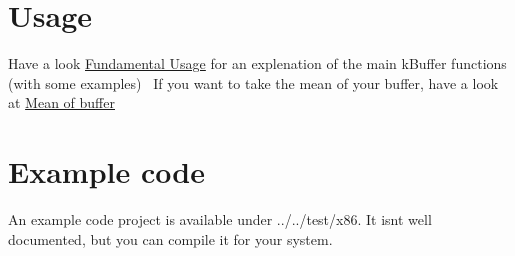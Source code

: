  \hypertarget{index_usage}{}\section{Usage}\label{index_usage}
Have a look \hyperlink{fundamental_usage}{Fundamental Usage} for an explenation of the main k\+Buffer functions (with some examples)~\newline
 If you want to take the mean of your buffer, have a look at \hyperlink{mean}{Mean of buffer} \hypertarget{index_example}{}\section{Example code}\label{index_example}
An example code project is available under ../../test/x86. It isn\textquotesingle{}t well documented, but you can compile it for your system. 